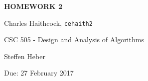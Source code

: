 \documentclass{article}
\newcommand{\homeworktitle}{\uppercase{Homework 2}}
\newcommand{\homeworkauthor}{Charles Haithcock}
\newcommand{\unityid}{cehaith2}
\newcommand{\duedate}{Due: 27 February 2017}
\newcommand{\coursetitle}{CSC 505 - Design and Analysis of Algorithms}
\newcommand{\instructor}{Steffen Heber}
\begin{document}
\begin{center}
    \huge\textbf{\homeworktitle}
\end{center}
\vspace{1cm}

\begin{center}
    \large\homeworkauthor, \texttt{\unityid}
\end{center}
\vspace{1cm}

\begin{center}
    \large\coursetitle 
    
    \instructor
\end{center}
\vspace{1cm}

\begin{center}
    \large\duedate
\end{center}
\vspace{1cm}

\newpage


\end{document}
